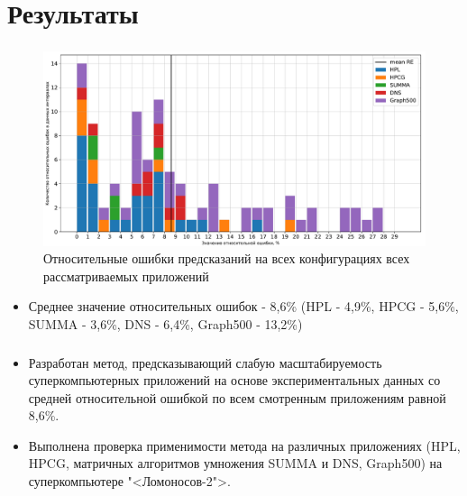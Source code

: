 \documentclass[unicode, t, 11pt]{beamer}%
\begin{document}
	\section{Результаты}
		\begin{frame}
			\frametitle{\insertsection}
			\footnotesize
			\begin{figure}
				\captionsetup{font=tiny, labelfont=tiny}
				\centering
				\includegraphics[width=\textwidth]{./images/RE_graph}
				\caption{Относительные ошибки предсказаний на всех конфигурациях всех рассматриваемых приложений}
			\end{figure}
			
			\begin{itemize}[label = \(\bullet\)]
			\item Среднее значение относительных ошибок - 8,6\% (HPL - 4,9\%, HPCG - 5,6\%, SUMMA - 3,6\%, DNS - 6,4\%, Graph500 - 13,2\%)

			\end{itemize}
		\end{frame}
		\begin{frame}
			\frametitle{\insertsection}
			\begin{itemize}[label = \(\bullet\)]
			\item Разработан метод, предсказывающий слабую масштабируемость суперкомпьютерных приложений на основе экспериментальных данных со средней относительной ошибкой по всем смотренным приложениям равной 8,6\%.
			\item Выполнена проверка применимости метода на различных приложениях (HPL, HPCG, матричных алгоритмов умножения SUMMA и DNS, Graph500) на суперкомпьютере "<Ломоносов-2">.
			\end{itemize}
		\end{frame}
\end{document}
